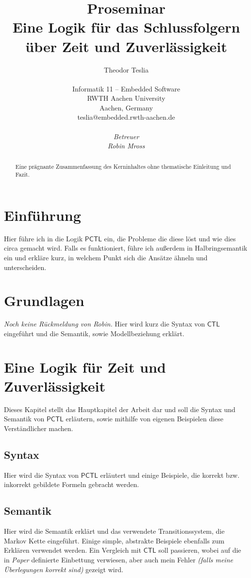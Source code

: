 \documentclass{lni}
\author{
	Theodor Teslia \\ 
	\\ 
	Informatik 11 -- Embedded Software \\ 
	RWTH Aachen University \\ 
	Aachen, Germany \\ 
	teslia@embedded.rwth-aachen.de\\
	\\
	\textit{Betreuer}\\
	\textit{Robin Mross}\\ %
}
\title{\small{Proseminar} \\ \vspace{0.5cm} \Large{Eine Logik für das Schlussfolgern über Zeit und Zuverlässigkeit}}
\newcommand{\CTL}{\mathsf{CTL}}
\newcommand{\PCTL}{\mathsf{PCTL}}
\begin{document}
\maketitle

\begin{abstract}
Eine prägnante Zusammenfassung des Kerninhaltes ohne thematische Einleitung und Fazit. 
\end{abstract}

\section{Einführung}

Hier führe ich in die Logik $\PCTL$ ein, die Probleme die diese löst und wie dies circa gemacht wird.
Falls es funktioniert, führe ich außerdem in Halbringsemantik ein und erkläre kurz, in welchem Punkt sich die Ansätze ähneln und unterscheiden.

\section{Grundlagen}

\emph{Noch keine Rückmeldung von Robin.} Hier wird kurz die Syntax von $\CTL$ eingeführt und die Semantik, sowie Modellbeziehung erklärt.

\section{Eine Logik für Zeit und Zuverlässigkeit}

Dieses Kapitel stellt das Hauptkapitel der Arbeit dar und soll die Syntax und Semantik von $\PCTL$ erläutern, sowie mithilfe von eigenen Beispielen diese Verständlicher machen.

\subsection{Syntax}

Hier wird die Syntax von $\PCTL$ erläutert und einige Beispiele, die korrekt bzw. inkorrekt gebildete Formeln gebracht werden.

\subsection{Semantik}

Hier wird die Semantik erklärt und das verwendete Transitionssystem, die Markov Kette eingeführt. 
Einige simple, abstrakte Beispiele ebenfalls zum Erklären verwendet werden.
Ein Vergleich mit $\CTL$ soll passieren, wobei auf die in \emph{Paper} definierte Einbettung verwiesen, aber auch mein Fehler \emph{(falls meine Überlegungen korrekt sind)} gezeigt wird.
\end{document}
